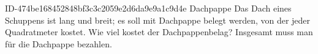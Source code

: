 \begin{exercise}
      {ID-474be168452848bf3c3c2059e2d6da9e9a1c9d4e}
      {Dachpappe}
  \ifproblem\problem
    Das Dach eines Schuppens ist  lang und  breit; es soll
    mit Dachpappe belegt werden, von der jeder Quadratmeter  kostet.
    Wie viel kostet der Dachpappenbelag?
  \fi
  \ifoutcome\outcome
    Insgesamt muss man für die Dachpappe  bezahlen.
  \fi
\end{exercise}
